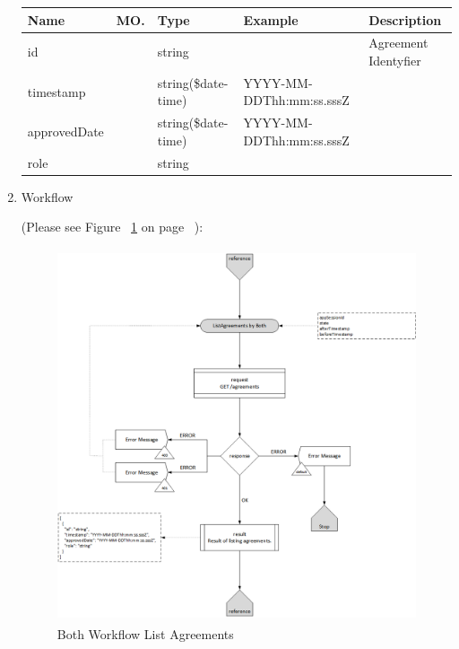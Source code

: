 \begin{enumerate}
\begin{tcolorbox}[boxrule=0pt, frame empty]
\begin{verbatim}
\end{verbatim}
\end{tcolorbox}

\begin{table}[H]
\footnotesize

\begin{center}
\begin{tabular}{|p{3cm}|l|p{3cm}|p{3cm}|p{4cm}|} 
\hline
\rowcolor{lightgray}	Name	& MO.	& Type	& Example & 	Description \\
\hline

id				& 	& 	string				&								&	Agreement Identyfier \\ 
\hline

timestamp		& 	& 	string(\$date-time)	&	YYYY-MM-DDThh:mm:ss.sssZ	&	 \\ 
\hline

approvedDate	& 	& 	string(\$date-time)	&	YYYY-MM-DDThh:mm:ss.sssZ	&	 \\ 
\hline

role			& 	& 	string				&								&	 \\ 
\hline

\end{tabular}
\end{center}

\end{table}


\item Workflow

(Please see Figure ~\ref{fig:BLA} on page ~\pageref{fig:BLA}):

\begin{figure}[H]
    \centering
    \includegraphics[width=11cm,height=11cm,angle=0]{./diag/Workflow/Market/ListAgreements-B-Workflow.png}
    \caption{Both Workflow List Agreements }
	\label{fig:BLA}
\end{figure}

\end{enumerate}

